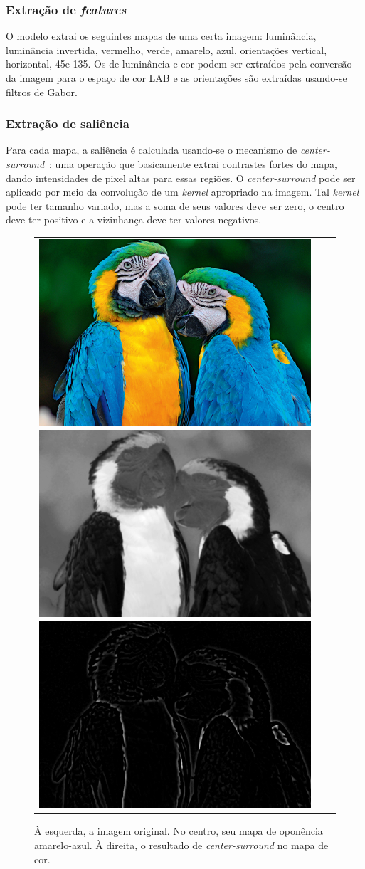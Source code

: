 \documentclass[11pt]{article}
\newcommand{\tit}[1]{\textit{#1}}
\begin{document}
\subsubsection{Extração de \tit{features}}
O modelo extrai os seguintes mapas de uma certa imagem:
luminância, luminância invertida, vermelho, verde, amarelo, azul,
orientações vertical, horizontal, 45\degree e 135\degree.
Os de luminância e cor podem ser extraídos pela conversão da imagem para o
espaço de cor LAB e as orientações são extraídas usando-se filtros de Gabor.

\subsubsection{Extração de saliência}
Para cada mapa, a saliência é calculada usando-se o mecanismo de
\tit{center-surround}~\cite{Frintrop2006}:
uma operação que basicamente extrai contrastes fortes
do mapa, dando intensidades de pixel altas para essas regiões.
O \tit{center-surround} pode ser aplicado por meio da convolução de um
\tit{kernel} apropriado na imagem.
Tal \tit{kernel} pode ter tamanho variado, mas a soma de seus valores deve
ser zero, o centro deve ter positivo e a vizinhança deve ter valores
negativos.
\begin{figure}[H]
\begin{center}
		\begin{tabular} {ccc}
            \includegraphics[width=0.3\linewidth]{img/arara.jpg}
            \includegraphics[width=0.3\linewidth]{img/arara_y.png}
            \includegraphics[width=0.3\linewidth]{img/arara_y_cs.png}
		\end{tabular}
\end{center}
\caption{À esquerda, a imagem original. No centro, seu mapa de oponência
amarelo-azul. À direita, o resultado de \tit{center-surround}
no mapa de cor.}
\label{fig:extrfeat}
\end{figure}
\end{document}
